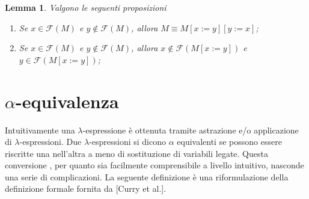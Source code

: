 \documentclass[a4paper,11pt]{article}
\newtheorem{lemma}{Lemma}
\theoremstyle{definition}
\newtheorem{defn}{Definizione}
\newcommand{\FF}{\mathcal{F}}
\begin{document}
\begin{lemma}
  Valgono le seguenti proposizioni
  \begin{enumerate}
    \item Se $x\in\FF(M)$ e $y\not\in\FF(M)$, allora $M\equiv M[x:=y][y:=x]$;
    \item Se $x\in\FF(M)$ e $y\not\in\FF(M)$, allora $x\not\in\FF(M[x:=y])$ e
      $y\in\FF(M[x:=y])$;
  \end{enumerate}
  \label{lem:sost}
\end{lemma}

\section{$\alpha$-equivalenza}
Intuitivamente una $\lambda$-espressione è ottenuta tramite astrazione e/o
applicazione di $\lambda$-espressioni. Due $\lambda$-espressioni si dicono
$\alpha$ equivalenti se possono essere riscritte una nell'altra a meno di
sostituzione di variabili legate. Questa conversione , per quanto sia
facilmente comprensibile a livello intuitivo, nasconde una serie di
complicazioni. La seguente definizione è una riformulazione della definizione formale
fornita da [Curry et al.].




%
\end{document}

